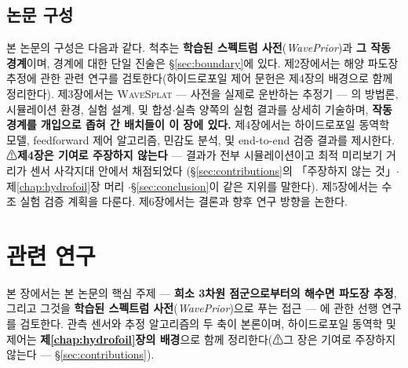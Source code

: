 \documentclass[11pt]{report}
\numberwithin{equation}{chapter}
\numberwithin{figure}{chapter}
\numberwithin{table}{chapter}
\newcommand{\WS}{\textsc{WaveSplat}}
\begin{document}
\section{논문 구성}
\label{sec:organization}

본 논문의 구성은 다음과 같다. 척추는 \textbf{학습된 스펙트럼 사전}(\emph{WavePrior})과
\textbf{그 작동 경계}이며, 경계에 대한 단일 진술은 \S\ref{sec:boundary}에 있다.
제2장에서는 해양 파도장 추정에 관한 관련 연구를 검토한다(하이드로포일 제어 문헌은
제4장의 배경으로 함께 정리한다).
제3장에서는 \WS{} --- 사전을 실제로 운반하는 추정기 --- 의 방법론, 시뮬레이션 환경,
실험 설계, 및 합성$\cdot$실측 양쪽의 실험 결과를 상세히 기술하며, \textbf{작동 경계를
개입으로 좁혀 간 배치들이 이 장에 있다.}
제4장에서는 하이드로포일 동역학 모델, feedforward 제어 알고리즘, 민감도 분석,
및 end-to-end 검증 결과를 제시한다. ⚠\textbf{제4장은 기여로 주장하지 않는다} ---
결과가 전부 시뮬레이션이고 최적 미리보기 거리가 센서 사각지대 안에서 채점되었다
(\S\ref{sec:contributions}의 「주장하지 않는 것」$\cdot$제\ref{chap:hydrofoil}장 머리
$\cdot$\S\ref{sec:conclusion}이 같은 지위를 말한다).
제5장에서는 수조 실험 검증 계획을 다룬다.
제6장에서는 결론과 향후 연구 방향을 논한다.

\chapter{관련 연구}
\label{chap:related}

본 장에서는 본 논문의 핵심 주제 --- \textbf{희소 3차원 점군으로부터의 해수면 파도장
추정}, 그리고 그것을 \textbf{학습된 스펙트럼 사전}(\emph{WavePrior})으로 푸는 접근
--- 에 관한 선행 연구를 검토한다. 관측 센서와 추정 알고리즘의 두 축이 본론이며,
하이드로포일 동역학 및 제어는 \textbf{제\ref{chap:hydrofoil}장의 배경}으로 함께
정리한다(⚠그 장은 기여로 주장하지 않는다 --- \S\ref{sec:contributions}).
\end{document}
